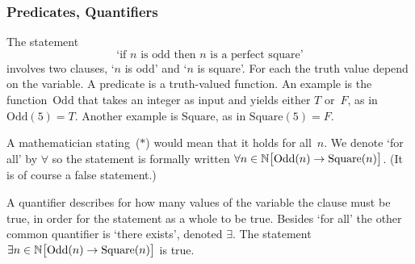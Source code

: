 \documentclass[10pt,t]{beamer}
\begin{document}
\begin{frame}
\frametitle{Predicates, Quantifiers}
The statement
\begin{equation*}
  \text{`if $n$ is odd then $n$ is a perfect square'}
  \tag{$*$}
\end{equation*}
involves two clauses, `$n$ is odd' and `$n$ is square'.
For each the truth value depend on the variable.
A \alert{predicate} is a truth-valued function.
An example is the function~$\text{Odd}$ that takes an integer as input and 
yields either $T$ or~$F$, as in~$\text{Odd}(5)=T$.
Another example is $\text{Square}$, as in $\text{Square}(5)=F$.

\pause
A mathematician stating~($*$) would mean that
it holds for all~$n$.
We denote `for all' by $\forall$ so the statement is formally written
$\forall n\in\mathbb{N} \big[\text{Odd}(n)\rightarrow\text{Square}(n)\big]$.
(It is of course a false statement.)

\pause
A
\alert{quantifier} describes for how many values of the
variable the clause must be true, in order for the statement as a whole to
be true.
Besides `for all' 
the other common quantifier is 
`there exists', denoted $\exists$.
The statement
$\exists n\in\mathbb{N} \big[\text{Odd}(n)\rightarrow\text{Square}(n)\big]$
is true.
\end{frame}
\end{document}
